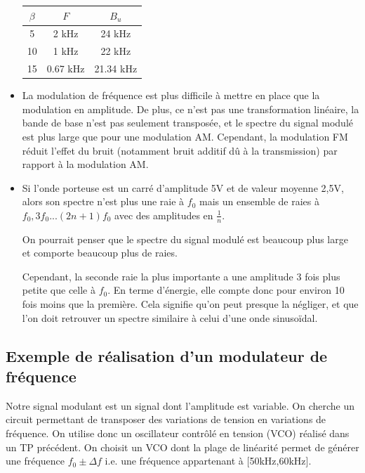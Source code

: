 \documentclass[../../Cours_M1.tex]{subfiles}
\begin{document}
\begin{itemize}
\begin{center}
\begin{tabular}{|c|c|c|}
\hline
$\beta$ & $F$ & $B_u$ \\
\hline
5 & 2 kHz & 24 kHz \\ 
\hline
10 & 1 kHz & 22 kHz \\
\hline
15 & 0.67 kHz & 21.34 kHz \\
\hline
\end{tabular}
\end{center}

\item La modulation de fréquence est plus difficile à mettre en place que la modulation en amplitude. De plus, ce n'est pas une transformation linéaire, la bande de base n'est pas seulement transposée, et le spectre du signal modulé est plus large que pour une modulation AM. Cependant, la modulation FM réduit l'effet du bruit (notamment bruit additif dû à la transmission) par rapport à la modulation AM.

\item Si l'onde porteuse est un carré d'amplitude 5V et de valeur moyenne 2,5V, alors son spectre n'est plus une raie à $f_0$ mais un ensemble de raies à $f_0,3f_0...(2n+1)f_0$ avec des amplitudes en $\frac{1}{n}$. 

On pourrait penser que le spectre du signal modulé est beaucoup plus large et comporte beaucoup plus de raies.

Cependant, la seconde raie la plus importante a une amplitude 3 fois plus petite que celle à $f_0$. En terme d'énergie, elle compte donc pour environ 10 fois moins que la première. Cela signifie qu'on peut presque la négliger, et que l'on doit retrouver un spectre similaire à celui d'une onde sinusoïdal.
\end{itemize}

\subsection{Exemple de réalisation d'un modulateur de fréquence}

Notre signal modulant est un signal dont l'amplitude est variable. On cherche un circuit permettant de transposer des variations de tension en variations de fréquence. On utilise donc un oscillateur contrôlé en tension (VCO) réalisé dans un TP précédent. On choisit un VCO dont la plage de linéarité permet de générer une fréquence $f_0\pm \Delta f$ i.e. une fréquence appartenant à [50kHz,60kHz].
\end{document}
